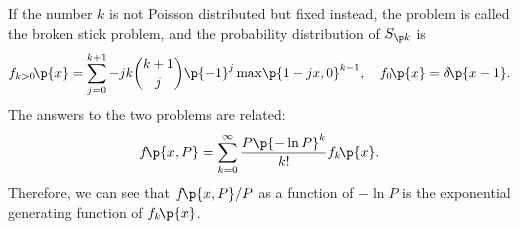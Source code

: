\documentclass{article}
\newcommand{\dlt}{\delta}
\newcommand{\fr}{\frac}
\newcommand{\opn}{\operatorname}
\newcommand{\fc}[2]{#1\mathchoice{\!}{\!}{}{}\p{#2}} %
\newcommand{\opc}[2]{\fc{\opn{#1}}{#2}} %
\begin{document}
If the number $k$ is not Poisson distributed but fixed instead,
the problem is called the broken stick problem, and the probability distribution of $S_{\p k}$ is \cite{holst}
\[\fc{f_{k>0}}x=\sum_{j=0}^{k+1}-jk\binom{k+1}j\p{-1}^j\opc{max}{1-jx,0}^{k-1},\quad
\fc{f_0}x=\fc\dlt{x-1}.\]
The answers to the two problems are related:
\[\fc f{x,P}=\sum_{k=0}^\infty\fr{P\p{-\ln P}^k}{k!}\fc{f_k}x.\]
Therefore, we can see that $\fc f{x,P}/P$ as a function of $-\ln P$
is the exponential generating function of $\fc{f_k}x$.

\printbibliography[heading=none]
\end{document}
